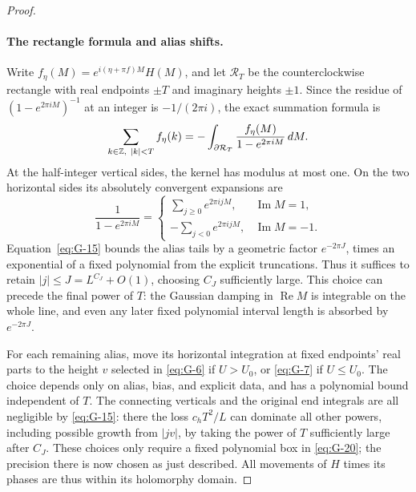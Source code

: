 \begin{proof}
\paragraph{The rectangle formula and alias shifts.}
Write \(f_\eta(M)=e^{i(\eta+\pi f)M}H(M)\), and let
\(\mathcal R_T\) be the counterclockwise rectangle with real
endpoints \(\pm T\) and imaginary heights \(\pm1\). Since the
residue of \((1-e^{2\pi iM})^{-1}\) at an integer is
\(-1/(2\pi i)\), the exact summation formula is
\[
 \sum_{k\in\mathbb Z,\ |k|<T}f_\eta(k)
       =-\int_{\partial\mathcal R_T}
                \frac{f_\eta(M)}{1-e^{2\pi iM}}\,dM.
\]
At the half-integer vertical sides, the kernel has modulus at most
one. On the two horizontal sides its absolutely convergent expansions
are
\[
 \frac1{1-e^{2\pi iM}}=
 \begin{cases}
 \displaystyle\sum_{j\ge0}e^{2\pi ijM},&\operatorname{Im}M=1,\\[3pt]
 \displaystyle-\sum_{j<0}e^{2\pi ijM},&\operatorname{Im}M=-1.
 \end{cases}
\]
Equation~\eqref{eq:G-15} bounds the alias tails by a geometric
factor \(e^{-2\pi J}\), times an exponential of a fixed polynomial
from the explicit truncations. Thus it suffices to retain
\(|j|\le J=L^{C_J}+O(1)\), choosing \(C_J\) sufficiently large.
This choice can precede the final power of \(T\): the Gaussian
damping in \(\operatorname{Re}M\) is integrable on the whole line,
and even any later fixed polynomial interval length is absorbed by
\(e^{-2\pi J}\).

For each remaining alias, move its horizontal integration at fixed endpoints' real parts to the height \(v\) selected in \eqref{eq:G-6} if \(U>U_0\), or \eqref{eq:G-7} if \(U\le U_0\). The choice depends only on alias, bias, and explicit data, and has a polynomial bound independent of \(T\). The connecting verticals and the original end integrals are all negligible by \eqref{eq:G-15}: there the loss \(c_h T^2/L\) can dominate all other powers, including possible growth from \(|j v|\), by taking the power of \(T\) sufficiently large after \(C_J\). These choices only require a fixed polynomial box in \eqref{eq:G-20}; the precision there is now chosen as just described. All movements of \(H\) times its phases are thus within its holomorphy domain.


\end{proof}

